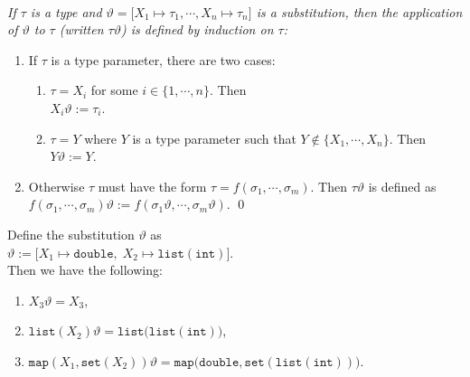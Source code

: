 \begin{Definition}
{\em \hspace*{\fill} \\
If  $\tau$ is a type and  
$\vartheta = \bigl[ X_1 \mapsto \tau_1, \cdots, X_n \mapsto \tau_n \bigr]$ is a
substitution, then the \emph{application} of $\vartheta$ to $\tau$   
(written $\tau\vartheta$) is defined by  induction on  $\tau$: 
\begin{enumerate}
\item If $\tau$ is a  type parameter, there are two cases:
  \begin{enumerate}
  \item $\tau = X_i$ for some $i\in\{1,\cdots,n\}$.  Then
        \\[0.2cm]
        \hspace*{1.3cm}
        $X_i\vartheta := \tau_i$.
  \item $\tau = Y$ where $Y$ is a type parameter such that $Y \not\in \{X_1,\cdots,X_n\}$. 
        Then
        \\[0.2cm]
        \hspace*{1.3cm}
        $Y\vartheta := Y$.
  \end{enumerate}
\item Otherwise $\tau$ must have the form $\tau = f(\sigma_1,\cdots,\sigma_m)$.
      Then $\tau\vartheta$ is defined as \\[0.2cm] 
      \hspace*{1.3cm} 
      $f(\sigma_1, \cdots, \sigma_m)\vartheta := f(\sigma_1\vartheta, \cdots,
      \sigma_m\vartheta)$.   \qed
\end{enumerate}
}
\end{Definition}

\examplesEng
Define the substitution $\vartheta$ as \\[0.2cm]
\hspace*{1.3cm} 
$\vartheta := \big[ X_1 \mapsto \mathtt{double},\; X_2 \mapsto \mathtt{list(int)} \big]$. \\[0.2cm]
Then we have the following:
\begin{enumerate}
\item $X_3\vartheta = X_3$,
\item $\mathtt{list}(X_2)\vartheta = \mathtt{list}\bigl(\mathtt{list(int)}\bigr)$,
\item $\mathtt{map}(X_1,\mathtt{set}(X_2))\vartheta = 
       \mathtt{map}\bigl(\mathtt{double},\mathtt{set}(\mathtt{list}(\mathtt{int}))\bigr)$.
\end{enumerate}


